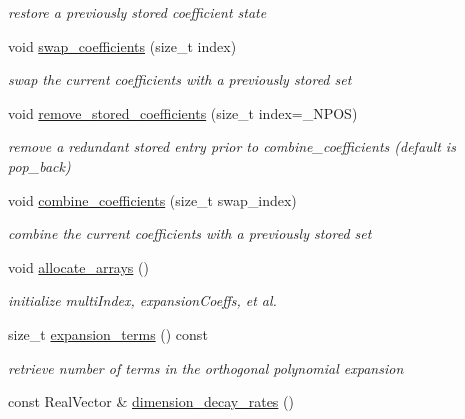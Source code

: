 \begin{DoxyCompactItemize}
\begin{DoxyCompactList}\small\item\em restore a previously stored coefficient state \end{DoxyCompactList}\item 
void \hyperlink{classPecos_1_1RegressOrthogPolyApproximation_af5c6af74d2c8c5575fefb46ce55af90d}{swap\+\_\+coefficients} (size\+\_\+t index)\label{classPecos_1_1RegressOrthogPolyApproximation_af5c6af74d2c8c5575fefb46ce55af90d}

\begin{DoxyCompactList}\small\item\em swap the current coefficients with a previously stored set \end{DoxyCompactList}\item 
void \hyperlink{classPecos_1_1RegressOrthogPolyApproximation_a63d12cc6021fda4896b8738d72dfcc86}{remove\+\_\+stored\+\_\+coefficients} (size\+\_\+t index=\+\_\+\+N\+P\+OS)\label{classPecos_1_1RegressOrthogPolyApproximation_a63d12cc6021fda4896b8738d72dfcc86}

\begin{DoxyCompactList}\small\item\em remove a redundant stored entry prior to combine\+\_\+coefficients (default is pop\+\_\+back) \end{DoxyCompactList}\item 
void \hyperlink{classPecos_1_1RegressOrthogPolyApproximation_a7c794213befc83c9f90137f22e4cd39d}{combine\+\_\+coefficients} (size\+\_\+t swap\+\_\+index)\label{classPecos_1_1RegressOrthogPolyApproximation_a7c794213befc83c9f90137f22e4cd39d}

\begin{DoxyCompactList}\small\item\em combine the current coefficients with a previously stored set \end{DoxyCompactList}\item 
void \hyperlink{classPecos_1_1RegressOrthogPolyApproximation_a37ef37829b412fefa40d53b395846781}{allocate\+\_\+arrays} ()\label{classPecos_1_1RegressOrthogPolyApproximation_a37ef37829b412fefa40d53b395846781}

\begin{DoxyCompactList}\small\item\em initialize multi\+Index, expansion\+Coeffs, et al. \end{DoxyCompactList}\item 
size\+\_\+t \hyperlink{classPecos_1_1RegressOrthogPolyApproximation_a1472574cce875722141b69b4eb629572}{expansion\+\_\+terms} () const 
\begin{DoxyCompactList}\small\item\em retrieve number of terms in the orthogonal polynomial expansion \end{DoxyCompactList}\item 
const Real\+Vector \& \hyperlink{classPecos_1_1RegressOrthogPolyApproximation_af479d04cda6ec328a589f1b63ddb37eb}{dimension\+\_\+decay\+\_\+rates} ()\label{classPecos_1_1RegressOrthogPolyApproximation_af479d04cda6ec328a589f1b63ddb37eb}


\end{DoxyCompactItemize}
